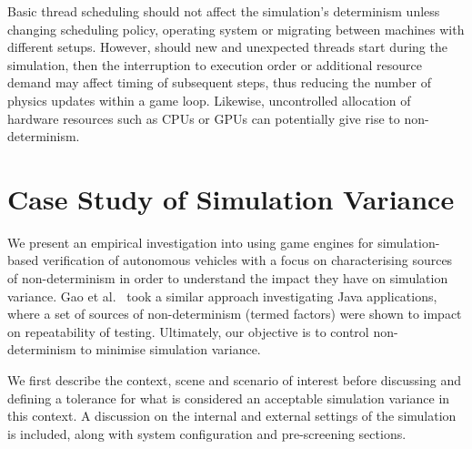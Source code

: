 Basic thread scheduling should not affect the simulation's determinism unless changing scheduling policy, operating system or migrating between machines with different setups. However, should new and unexpected threads start during the simulation, then the interruption to execution order or additional resource demand may affect timing of subsequent steps, thus reducing the number of physics updates within a game loop. Likewise, uncontrolled allocation of hardware resources such as CPUs or GPUs can potentially give rise to non-determinism. 


\section{Case Study of Simulation Variance} \label{s:case-study}

We present an empirical investigation into using game engines for
simulation-based verification of autonomous vehicles with a focus on
characterising sources of non-determinism in order to understand  the impact
they have on simulation variance. 
%
Gao et al.~\cite{when-and-what-should-we-control} took a similar approach investigating Java applications, where a set of sources of non-determinism (termed factors) were shown to impact on repeatability of testing. Ultimately, our objective is to control non-determinism to minimise simulation variance.

We first describe the context, scene and scenario of interest before discussing and defining a tolerance for what is considered an acceptable simulation variance in this context. A discussion on the internal and external settings of the simulation is included, along with system configuration and pre-screening sections. 

